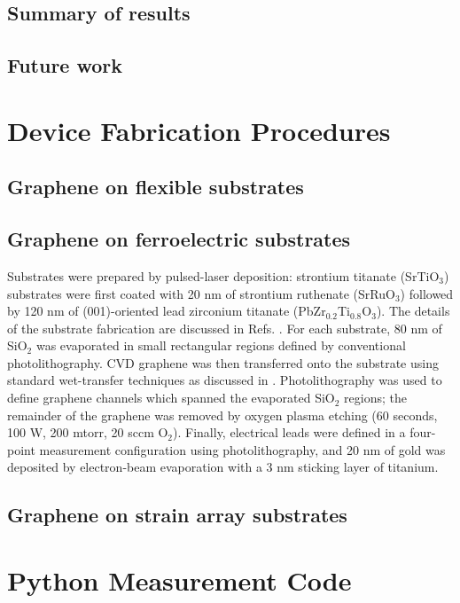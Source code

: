\documentclass[edeposit,fullpage,draftthesis]{uiucthesis2009}
\begin{document}
\section{Summary of results}
\section{Future work}

\begin{appendices}

\chapter{Device Fabrication Procedures}
\label{appendix:fab}
\section{Graphene on flexible substrates}
\section{Graphene on ferroelectric substrates}

Substrates were prepared by pulsed-laser deposition: strontium titanate (SrTiO$_3$) substrates were first coated with 20 nm of strontium ruthenate (SrRuO$_3$) followed by 120 nm of (001)-oriented lead zirconium titanate (PbZr$_{0.2}$Ti$_{0.8}$O$_3$). The details of the substrate fabrication are discussed in Refs. 
\cite{Xu2014,Karthik2012}.
For each substrate, 80 nm of SiO$_2$ was evaporated in small rectangular regions defined by conventional photolithography. CVD graphene was then transferred onto the substrate using standard wet-transfer techniques as discussed in \cite{Li2009}.
Photolithography was used to define graphene channels which spanned the evaporated SiO$_2$ regions; 
the remainder of the graphene was removed by oxygen plasma etching (60 seconds, 100 W, 200 mtorr, 20 sccm O$_2$). 
Finally, electrical leads were defined in a four-point measurement configuration using photolithography, and 20 nm of gold was deposited by electron-beam evaporation with a 3 nm sticking layer of titanium.

\section{Graphene on strain array substrates}

\chapter{Python Measurement Code}


\end{appendices}
\end{document}
